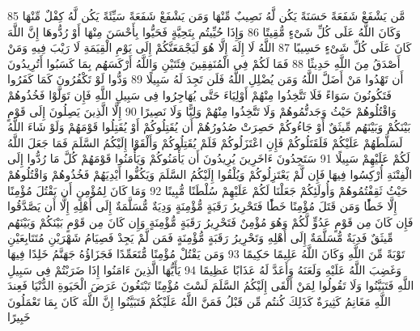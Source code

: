 \documentclass[20pt,a4paper]{article}
\begin{document}
{\tiny\colorbox{cl_aya}{85}} مَّن يَشْفَعْ شَفَعَةً حَسَنَةً يَكُن لَّهُ نَصِيبٌ مِّنْهَا وَمَن يَشْفَعْ شَفَعَةً سَيِّئَةً يَكُن لَّهُ كِفْلٌ مِّنْهَا وَكَانَ اللَّهُ عَلَى كُلِّ شَىْءٍ مُّقِيتًا
{\tiny\colorbox{cl_aya}{86}} وَإِذَا حُيِّيتُم بِتَحِيَّةٍ فَحَيُّوا بِأَحْسَنَ مِنْهَا أَوْ رُدُّوهَا إِنَّ اللَّهَ كَانَ عَلَى كُلِّ شَىْءٍ حَسِيبًا
{\tiny\colorbox{cl_aya}{87}} اللَّهُ لَا إِلَهَ إِلَّا هُوَ لَيَجْمَعَنَّكُمْ إِلَى يَوْمِ الْقِيَمَةِ لَا رَيْبَ فِيهِ وَمَنْ أَصْدَقُ مِنَ اللَّهِ حَدِيثًا
{\tiny\colorbox{cl_aya}{88}} فَمَا لَكُمْ فِى الْمُنَفِقِينَ فِئَتَيْنِ وَاللَّهُ أَرْكَسَهُم بِمَا كَسَبُوا أَتُرِيدُونَ أَن تَهْدُوا مَنْ أَضَلَّ اللَّهُ وَمَن يُضْلِلِ اللَّهُ فَلَن تَجِدَ لَهُ سَبِيلًا
{\tiny\colorbox{cl_aya}{89}} وَدُّوا لَوْ تَكْفُرُونَ كَمَا كَفَرُوا فَتَكُونُونَ سَوَاءً فَلَا تَتَّخِذُوا مِنْهُمْ أَوْلِيَاءَ حَتَّى يُهَاجِرُوا فِى سَبِيلِ اللَّهِ فَإِن تَوَلَّوْا فَخُذُوهُمْ وَاقْتُلُوهُمْ حَيْثُ وَجَدتُّمُوهُمْ وَلَا تَتَّخِذُوا مِنْهُمْ وَلِيًّا وَلَا نَصِيرًا
{\tiny\colorbox{cl_aya}{90}} إِلَّا الَّذِينَ يَصِلُونَ إِلَى قَوْمٍ بَيْنَكُمْ وَبَيْنَهُم مِّيثَقٌ أَوْ جَاءُوكُمْ حَصِرَتْ صُدُورُهُمْ أَن يُقَتِلُوكُمْ أَوْ يُقَتِلُوا قَوْمَهُمْ وَلَوْ شَاءَ اللَّهُ لَسَلَّطَهُمْ عَلَيْكُمْ فَلَقَتَلُوكُمْ فَإِنِ اعْتَزَلُوكُمْ فَلَمْ يُقَتِلُوكُمْ وَأَلْقَوْا إِلَيْكُمُ السَّلَمَ فَمَا جَعَلَ اللَّهُ لَكُمْ عَلَيْهِمْ سَبِيلًا
{\tiny\colorbox{cl_aya}{91}} سَتَجِدُونَ ءَاخَرِينَ يُرِيدُونَ أَن يَأْمَنُوكُمْ وَيَأْمَنُوا قَوْمَهُمْ كُلَّ مَا رُدُّوا إِلَى الْفِتْنَةِ أُرْكِسُوا فِيهَا فَإِن لَّمْ يَعْتَزِلُوكُمْ وَيُلْقُوا إِلَيْكُمُ السَّلَمَ وَيَكُفُّوا أَيْدِيَهُمْ فَخُذُوهُمْ وَاقْتُلُوهُمْ حَيْثُ ثَقِفْتُمُوهُمْ وَأُولَئِكُمْ جَعَلْنَا لَكُمْ عَلَيْهِمْ سُلْطَنًا مُّبِينًا
{\tiny\colorbox{cl_aya}{92}} وَمَا كَانَ لِمُؤْمِنٍ أَن يَقْتُلَ مُؤْمِنًا إِلَّا خَطًَٔا وَمَن قَتَلَ مُؤْمِنًا خَطًَٔا فَتَحْرِيرُ رَقَبَةٍ مُّؤْمِنَةٍ وَدِيَةٌ مُّسَلَّمَةٌ إِلَى أَهْلِهِ إِلَّا أَن يَصَّدَّقُوا فَإِن كَانَ مِن قَوْمٍ عَدُوٍّ لَّكُمْ وَهُوَ مُؤْمِنٌ فَتَحْرِيرُ رَقَبَةٍ مُّؤْمِنَةٍ وَإِن كَانَ مِن قَوْمٍ بَيْنَكُمْ وَبَيْنَهُم مِّيثَقٌ فَدِيَةٌ مُّسَلَّمَةٌ إِلَى أَهْلِهِ وَتَحْرِيرُ رَقَبَةٍ مُّؤْمِنَةٍ فَمَن لَّمْ يَجِدْ فَصِيَامُ شَهْرَيْنِ مُتَتَابِعَيْنِ تَوْبَةً مِّنَ اللَّهِ وَكَانَ اللَّهُ عَلِيمًا حَكِيمًا
{\tiny\colorbox{cl_aya}{93}} وَمَن يَقْتُلْ مُؤْمِنًا مُّتَعَمِّدًا فَجَزَاؤُهُ جَهَنَّمُ خَلِدًا فِيهَا وَغَضِبَ اللَّهُ عَلَيْهِ وَلَعَنَهُ وَأَعَدَّ لَهُ عَذَابًا عَظِيمًا
{\tiny\colorbox{cl_aya}{94}} يَأَيُّهَا الَّذِينَ ءَامَنُوا إِذَا ضَرَبْتُمْ فِى سَبِيلِ اللَّهِ فَتَبَيَّنُوا وَلَا تَقُولُوا لِمَنْ أَلْقَى إِلَيْكُمُ السَّلَمَ لَسْتَ مُؤْمِنًا تَبْتَغُونَ عَرَضَ الْحَيَوةِ الدُّنْيَا فَعِندَ اللَّهِ مَغَانِمُ كَثِيرَةٌ كَذَلِكَ كُنتُم مِّن قَبْلُ فَمَنَّ اللَّهُ عَلَيْكُمْ فَتَبَيَّنُوا إِنَّ اللَّهَ كَانَ بِمَا تَعْمَلُونَ خَبِيرًا
\end{document}
